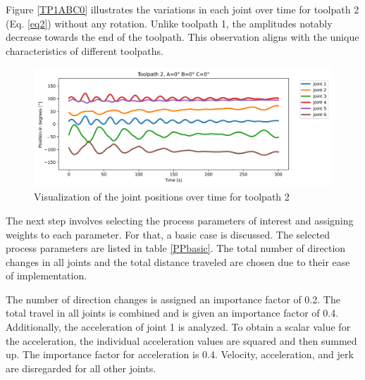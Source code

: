 
Figure \ref{TP1ABC0} illustrates the variations in each joint over time for toolpath 2 (Eq. \ref{eq2}) without any rotation. Unlike toolpath 1, the amplitudes notably decrease towards the end of the toolpath. This observation aligns with the unique characteristics of different toolpaths.
 
\begin{figure}[H]
	\centerline{\includegraphics[width=1\textwidth]{figures/TP2ABC0.png}}
	\caption{Visualization of the joint positions over time for toolpath 2}
	\label{TP2ABC0}
\end{figure}

The next step involves selecting the process parameters of interest and assigning weights to each parameter. For that, a basic case is discussed. The selected process parameters are listed in table \ref{PPbasic}. The total number of direction changes in all joints and the total distance traveled are chosen due to their ease of implementation.

The number of direction changes is assigned an importance factor of 0.2.
The total travel in all joints is combined and is given an importance factor of 0.4.
Additionally, the acceleration of joint 1 is analyzed. To obtain a scalar value for the acceleration, the individual acceleration values are squared and then summed up. The importance factor for acceleration is 0.4.
Velocity, acceleration, and jerk are disregarded for all other joints.

